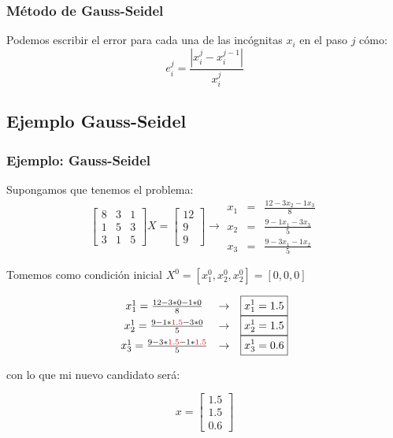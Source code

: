 \documentclass[xcolor=svgnames]{beamer} %
\theoremstyle{plain}
\theoremstyle{definition}
\begin{document}
\begin{frame}
\frametitle{Método de Gauss-Seidel}
Podemos escribir el error para cada una de las incógnitas $x_i$ en el paso $j$ cómo:
$$ e_i^j = \frac{|x_i^j -x_i^{j-1}|}{x_i^j}$$
\end{frame}


\subsection{Ejemplo Gauss-Seidel}

\begin{frame}
\frametitle{Ejemplo: Gauss-Seidel}

Supongamos que tenemos el problema:
$$  \begin{bmatrix}
8 & 3 & 1 \\
1 & 5 & 3 \\
3 & 1 & 5
\end{bmatrix} X = \begin{bmatrix}
12\\
9\\
9
\end{bmatrix} \rightarrow \begin{array}{ccc}
x_1 &=& \frac{12-3x_2-1x_3}{8}\\
x_2 &=& \frac{9-1x_1-3x_3}{5}\\
x_3 &=& \frac{9-3x_1-1x_2}{5}
\end{array}$$

Tomemos como condición inicial $X^0 = [x_1^0,x_2^0,x_2^0] = [0,0,0]$

\begin{minipage}{.65\linewidth}
\pause
$$\begin{array}{ccc}
x_1^1 = \frac{12-3*0-1*0}{8} &\rightarrow & \boxed{x_1^1 = 1.5}\\
x_2^1 = \frac{9-1*{\color{red}1.5}-3*0}{5} &\rightarrow & \boxed{x_2^1 = 1.5}\\
x_3^1 = \frac{9-3*{\color{red}1.5}-1*{\color{red}1.5}}{5} &\rightarrow & \boxed{x_3^1 = 0.6}
\end{array}$$

\end{minipage}\pause \vrule \begin{minipage}{.3\linewidth}
con lo que mi nuevo candidato será:

$$x = \begin{bmatrix}
1.5\\
1.5\\
0.6
\end{bmatrix}$$

\end{minipage}
\end{frame}
\end{document}
